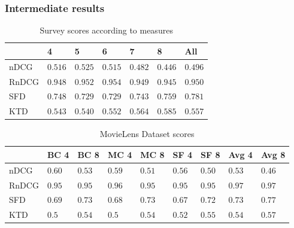 \begin{frame}
\frametitle{Intermediate results}
\begin{table}[H]
	\centering
	\begin{tabular}{|l|llllll|} \hline
		& 4 & 5 & 6 & 7 & 8 & All \\ \hline
		nDCG	& $0.516$	& $0.525$	& $0.515$	& $0.482$ & $0.446$ & $0.496$ \\
		RnDCG	& $0.948$	& $0.952$	& $0.954$	& $0.949$ & $0.945$ & $0.950$ \\
		SFD	& $0.748$	& $0.729$	& $0.729$	& $0.743$ & $0.759$ & $0.781$ \\
		KTD	& $0.543$	& $0.540$	& $0.552$	& $0.564$ & $0.585$ & $0.557$ \\ \hline
	\end{tabular}
	\caption{Survey scores according to measures}
\end{table}

\begin{table}[H]
	\centering
	\begin{tabular}{|l|llllllll|} \hline
		& BC 4 & BC 8 & MC 4 & MC 8 & SF 4 & SF 8 & Avg 4 & Avg 8 \\ \hline
		nDCG	& $0.60$	& $0.53$	& $0.59$	& $0.51$ & $0.56$ & $0.50$ & $0.53$ & $0.46$ \\
		RnDCG	& $0.95$	& $0.95$	& $0.96$	& $0.95$ & $0.95$ & $0.95$ & $0.97$ & $0.97$ \\
		SFD	& $0.69$	& $0.73$	& $0.68$	& $0.73$ & $0.67$ & $0.72$ & $0.73$ & $0.77$ \\
		KTD	& $0.5$	& $0.54$	& $0.5$	& $0.54$ & $0.52$ & $0.55$ & $0.54$ & $0.57$\\ \hline
	\end{tabular}
	\caption{MovieLens Dataset scores}
\end{table}
\end{frame}

